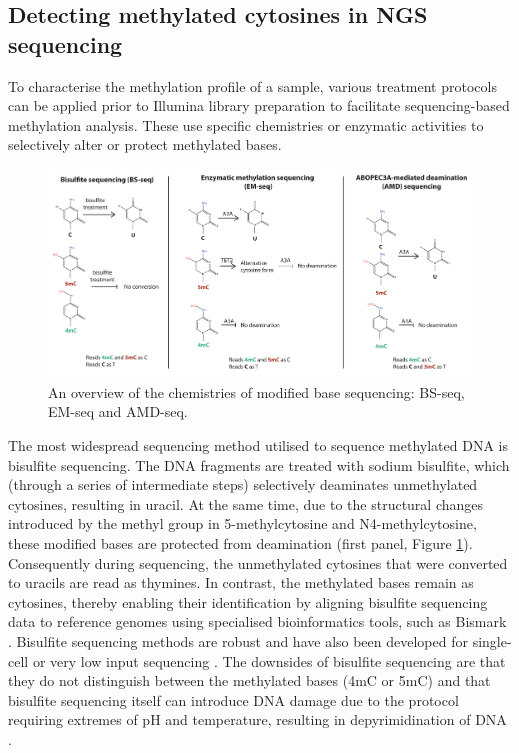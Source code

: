 \subsection{Detecting methylated cytosines in NGS sequencing}

To characterise the methylation profile of a sample, various treatment protocols can be applied prior to Illumina library preparation to facilitate sequencing-based methylation analysis. These use specific chemistries or enzymatic activities to selectively alter or protect methylated bases.

\begin{figure}[htbp!] 
\centering    
    \includegraphics[width=1\textwidth]{Chapter1/Figs/sequencing_chemistries.pdf}
\caption{An overview of the chemistries of modified base sequencing: BS-seq, EM-seq and AMD-seq.}
\label{fig:sequencing_chemistries}
\captionsetup{font=small}
\end{figure}

The most widespread sequencing method utilised to sequence methylated DNA is bisulfite sequencing. The DNA fragments are treated with sodium bisulfite, which (through a series of intermediate steps) selectively deaminates unmethylated cytosines, resulting in uracil. At the same time, due to the structural changes introduced by the methyl group in 5-methylcytosine and N4-methylcytosine, these modified bases are protected from deamination (first panel, Figure \ref{fig:sequencing_chemistries}). Consequently during sequencing, the unmethylated cytosines that were converted to uracils are read as thymines. In contrast, the methylated bases remain as cytosines, thereby enabling their identification by aligning bisulfite sequencing data to reference genomes using specialised bioinformatics tools, such as Bismark \cite{RN229}. Bisulfite sequencing methods are robust and have also been developed for single-cell or very low input sequencing \cite{RN207}. The downsides of bisulfite sequencing are that they do not distinguish between the methylated bases (4mC or 5mC) \cite{RN200} and that bisulfite sequencing itself can introduce DNA damage due to the protocol requiring extremes of pH and temperature, resulting in depyrimidination of DNA \cite{RN318}.

